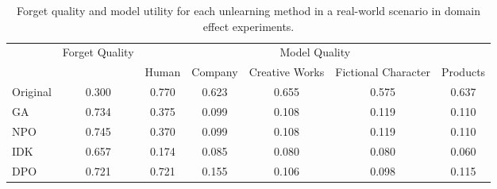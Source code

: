 \begin{table*}[t]
\centering
\begin{tabular}{l c c c c c c}
\hline
 & Forget Quality & \multicolumn{5}{c}{Model Quality} \\
\cline{3-7}
 & & Human & Company & Creative Works & Fictional Character & Products \\
\hline
Original & 0.300 & 0.770 & 0.623 & 0.655 & 0.575 & 0.637 \\
GA       & 0.734 & 0.375 & 0.099 & 0.108 & 0.119 & 0.110 \\
NPO      & 0.745 & 0.370 & 0.099 & 0.108 & 0.119 & 0.110 \\
IDK      & 0.657 & 0.174 & 0.085 & 0.080 & 0.080 & 0.060 \\
DPO      & 0.721 & 0.721 & 0.155 & 0.106 & 0.098 & 0.115 \\
\hline
\end{tabular}
\caption{Forget quality and model utility for each unlearning method in a real-world scenario in domain effect experiments.}
\end{table*}